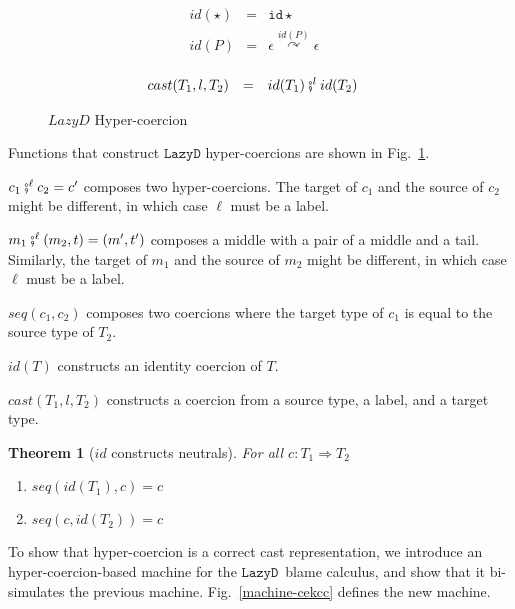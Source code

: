 \documentclass[acmsmall,review,anonymous]{acmart}\settopmatter{printfolios=true,printccs=false,printacmref=false}
\newtheorem{theorem}{Theorem}[]
\newcommand{\figref}[1]{Fig.~\ref{#1}}
\newcommand{\funrule}[3]{#1 &=& #2 & #3\\}
\newcommand{\lazyD}{$\mathtt{Lazy D}$}
\newcommand{\hyperCoercionI}[0]{\mathtt{id\star}}
\newcommand{\hyperCoercionC}[3]{#1 \overset{#2}{\curvearrowright} #3}
\begin{document}
\begin{figure}
	\[
	\begin{array}{rclr}
	\funrule{id(\star)}{
		\hyperCoercionI
	}{}
	\funrule{id(P)}{
		\hyperCoercionC{\epsilon}{id(P)}{\epsilon}
	}{}
	\end{array}
	\]
	
	\[
	\begin{array}{rclr}
	\funrule{cast(T_1,l,T_2)}{
		id(T_1) \fatsemi^l id(T_2)
	}{}
	\end{array}
	\]
	\caption{$Lazy D$ Hyper-coercion}
	\label{fig:HC-D}
\end{figure}

Functions that construct \lazyD{} hyper-coercions are shown in 
\figref{fig:HC-D}. 

$ c_1 \fatsemi^\ell c_2 = c' $ composes two hyper-coercions. The target of $ 
c_1 $ and the source of $ c_2 $ might be different, in which case $ \ell $ must 
be a label.

$ m_1 \fatsemi^\ell (m_2,t) = (m',t') $ composes a middle with a 
pair of a middle and a tail. Similarly, the target of $ m_1 $ and the source of 
$ m_2 $ might be different, in which case $ \ell $ must be a label.

$ seq(c_1,c_2) $ composes two coercions where the target type of $ c_1 $ is 
equal to the source type of $ T_2 $.

$ id(T) $ constructs an identity coercion of $ T $. 

$ cast(T_1,l,T_2) $ constructs a coercion from a source type, a label, and a 
target type. 

\begin{theorem}[$ id $ constructs neutrals] For all $ c : T_1 \Longrightarrow 
	T_2 $
	\begin{enumerate}
		\item $ seq(id(T_1),c) = c $
		\item $ seq(c,id(T_2)) = c $
	\end{enumerate}
\end{theorem}

To show that hyper-coercion is a correct cast representation, we introduce an 
hyper-coercion-based machine for the \lazyD\ blame calculus, and show that it 
bi-simulates the previous machine. 
\figref{machine-cekcc} defines the new machine.
\end{document}
